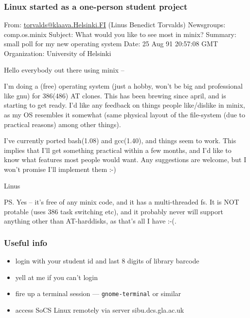 \documentclass{beamer}
\begin{document}
\begin{frame}
\frametitle{Linux started as a one-person student project}
  {\tiny
    From: \url{torvalds@klaava.Helsinki.FI} (Linus Benedict Torvalds)
    Newsgroups: comp.os.minix
    Subject: What would you like to see most in minix?
    Summary: small poll for my new operating system
    Date: 25 Aug 91 20:57:08 GMT
    Organization: University of Helsinki

    Hello everybody out there using minix –

    I’m doing a (free) operating system (just a hobby, won’t be big and
    professional like gnu) for 386(486) AT clones. This has been brewing
    since april, and is starting to get ready. I’d like any feedback on
    things people like/dislike in minix, as my OS resembles it somewhat
    (same physical layout of the file-system (due to practical reasons)
    among other things).

    I’ve currently ported bash(1.08) and gcc(1.40), and things seem to work.
    This implies that I’ll get something practical within a few months, and
    I’d like to know what features most people would want. Any suggestions
    are welcome, but I won’t promise I’ll implement them :-)

    Linus 

    PS. Yes – it’s free of any minix code, and it has a multi-threaded fs.
    It is NOT protable (uses 386 task switching etc), and it probably never
    will support anything other than AT-harddisks, as that’s all I have :-(.

}
\end{frame}


\begin{frame}
  \frametitle{Useful info}
  \begin{itemize}
  \item login with your student id and last 8 digits of library barcode
  \item yell at me if you can't login
    \item fire up a terminal session --- \texttt{gnome-terminal} or similar
  \item access SoCS Linux remotely via server sibu.dcs.gla.ac.uk
  \end{itemize}
\end{frame}
\end{document}
